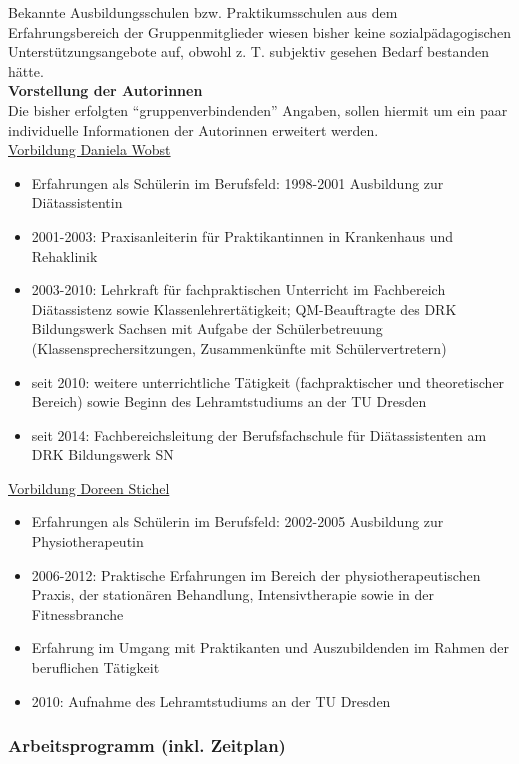 Bekannte Ausbildungsschulen bzw. Praktikumsschulen aus dem Erfahrungsbereich der Gruppenmitglieder wiesen bisher keine sozialpädagogischen Unterstützungsangebote auf, obwohl z. T. subjektiv gesehen Bedarf bestanden hätte.\\

\noindent
\textbf{Vorstellung der Autorinnen}\\

\noindent
Die bisher erfolgten "`gruppenverbindenden"' Angaben, sollen hiermit um ein paar individuelle Informationen der Autorinnen erweitert werden.\\

\noindent
\underline{Vorbildung Daniela Wobst}
\begin{itemize}
	\item Erfahrungen als Schülerin im Berufsfeld: 1998-2001 Ausbildung zur Diätassistentin
	\item 2001-2003: Praxisanleiterin für Praktikantinnen in Krankenhaus und Rehaklinik
	\item 2003-2010: Lehrkraft für fachpraktischen Unterricht im Fachbereich Diätassistenz sowie Klassenlehrertätigkeit; QM-Beauftragte des DRK Bildungswerk Sachsen mit Aufgabe der Schülerbetreuung (Klassensprechersitzungen, Zusammenkünfte mit Schülervertretern)
	\item seit 2010: weitere unterrichtliche Tätigkeit (fachpraktischer und theoretischer Bereich) sowie Beginn des Lehramtstudiums an der TU Dresden
	\item seit 2014: Fachbereichsleitung der Berufsfachschule für Diätassistenten am DRK Bildungswerk SN
\end{itemize}

\noindent
\underline{Vorbildung Doreen Stichel}
\begin{itemize}
	\item Erfahrungen als Schülerin im Berufsfeld: 2002-2005 Ausbildung zur Physiotherapeutin
	\item 2006-2012: Praktische Erfahrungen im Bereich der physiotherapeutischen Praxis, der stationären Behandlung, Intensivtherapie sowie in der Fitnessbranche
	\item Erfahrung im Umgang mit Praktikanten und Auszubildenden im Rahmen der beruflichen Tätigkeit
	\item 2010: Aufnahme des Lehramtstudiums an der TU Dresden
\end{itemize}

\newpage
\subsubsection{Arbeitsprogramm (inkl. Zeitplan)}
\label{sec:ArbeitsprogrammInklZeitplan}

